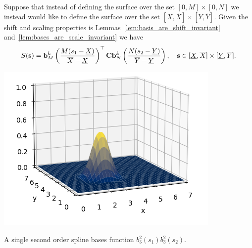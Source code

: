Suppose that instead of defining the surface over the set $[0, M]\times[0, N]$ we instead would like to define the surface over the set $[\underline{X}, \overline{X}]\times[\underline{Y}, \overline{Y}]$.  Given the shift and scaling properties is Lemmas~\ref{lem:basis_are_shift_invariant} and~\ref{lem:bases_are_scale_invariant} we have 
\begin{equation}\label{eq:spline_surface3}
S(\sbf) = \bbf^k_M\left(\frac{M(s_1-\underline{X})}{\overline{X}-\underline{X}}\right)^\top \Cbf \bbf^k_N\left(\frac{N(s_2-\underline{Y})}{\overline{Y}-\underline{Y}}\right), \quad \sbf\in[\underline{X}, \overline{X}]\times[\underline{Y}, \overline{Y}].
\end{equation}

\begin{marginfigure}[0in]
  \includegraphics[width=\linewidth]{./chap5_trajectory_planning/figures/spline_surface_basis}
  \caption{A single second order spline bases function $b_3^2(s_1)b_3^2(s_2)$.}
  \label{fig:spline_surface_bases}  
\end{marginfigure}


